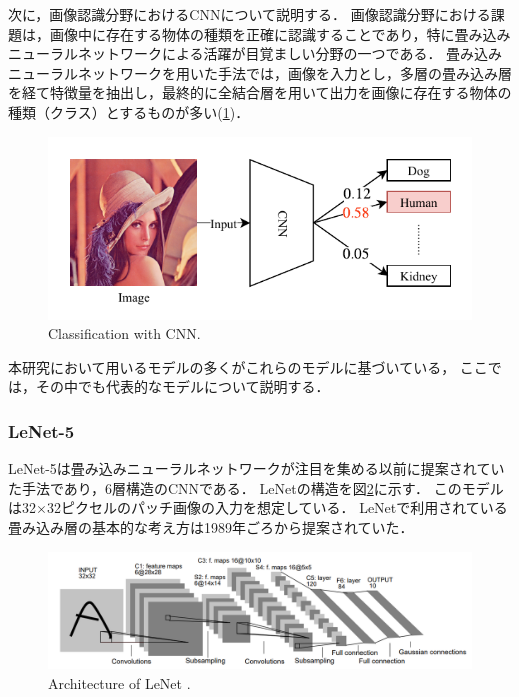 次に，画像認識分野におけるCNNについて説明する．
画像認識分野における課題は，画像中に存在する物体の種類を正確に認識することであり，特に畳み込みニューラルネットワークによる活躍が目覚ましい分野の一つである．
畳み込みニューラルネットワークを用いた手法では，画像を入力とし，多層の畳み込み層を経て特徴量を抽出し，最終的に全結合層を用いて出力を画像に存在する物体の種類（クラス）とするものが多い(\ref{fig:classification})．
\begin{figure}[ht]
  \centering
  \includegraphics[width=14cm]{8_appendix/img/image_classification.pdf}
  \caption{Classification with CNN.}
  \label{fig:classification}
\end{figure}

本研究において用いるモデルの多くがこれらのモデルに基づいている，
ここでは，その中でも代表的なモデルについて説明する．
\subsubsection{LeNet-5}
    LeNet-5\cite{lecun1998gradient, lecun1999object}は畳み込みニューラルネットワークが注目を集める以前に提案されていた手法であり，6層構造のCNNである．
    LeNetの構造を図\ref{fig:lenet}に示す．
    このモデルは32$\times$32ピクセルのパッチ画像の入力を想定している．
    LeNetで利用されている畳み込み層の基本的な考え方は1989年ごろから提案されていた\cite{lecun1989backpropagation}．
    \begin{figure}[ht]
      \centering
      \includegraphics[width=14cm]{8_appendix/img/lenet.png}
      \caption{Architecture of LeNet \cite{lecun1998gradient}.}
      \label{fig:lenet}
    \end{figure}

